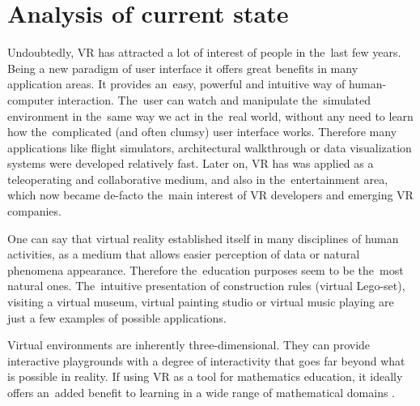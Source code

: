 
\section{Analysis of current state}
Undoubtedly, VR has attracted a lot of interest of people in the~last few years. Being a new paradigm of user interface it offers great benefits in many application areas. It provides an~easy, powerful and intuitive way of human-computer interaction. The~user can watch and manipulate the~simulated environment in the~same way we act in the~real world, without any need to learn how the~complicated (and often clumsy) user interface works. Therefore many applications like flight simulators, architectural walkthrough or data visualization systems were developed relatively fast. Later on, VR has was applied as a teleoperating and collaborative medium, and also in the~entertainment area, which now became de-facto the~main interest of VR developers and emerging VR companies.

One can say that virtual reality established itself in many disciplines of human activities, as a medium that allows easier perception of data or natural phenomena appearance. Therefore the~education purposes seem to be the~most natural ones. The~intuitive presentation of construction rules (virtual Lego-set), visiting a virtual museum, virtual painting studio or virtual music playing \citep{loeffler} are just a few examples of possible applications. 

Virtual environments are inherently three-dimensional. They can provide interactive playgrounds with a degree of interactivity that goes far beyond what is possible in reality. If using VR as a tool for mathematics education, it ideally offers an~added benefit to learning in a wide range of mathematical domains \citep{kaufmann}.

